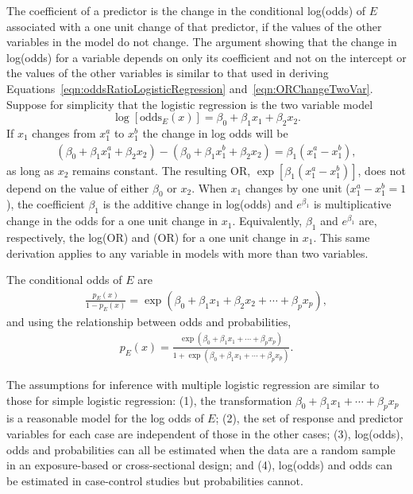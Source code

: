 The coefficient of a predictor is the change in the conditional log(odds) of $E$ associated with a one unit change of that predictor, if the values of the other variables in the model do not change.  The argument showing that the change in log(odds) for a variable depends on only its coefficient and not on the intercept or the values of the other variables is similar to that used in deriving Equations~\ref{eqn:oddsRatioLogisticRegression} and~\ref{eqn:ORChangeTwoVar}.  Suppose for simplicity that the logistic regression is the two variable model\[
  \log\left[\text{odds}_E(x)\right] = \beta_0 + \beta_1 x_1 +
      \beta_2 x_2.
\]
If $x_1$ changes from $x_1^a$ to $x_1^b$ the change in log odds will be
\begin{align*}
  (\beta_0 + \beta_1 x_1^a + \beta_2 x_2) -  (\beta_0 + \beta_1 x_1^b + \beta_2 x_2)
    = \beta_1(x_1^a - x_1^b),
\end{align*}
as long as $x_2$ remains constant.  The resulting OR, $\exp[\beta_1(x_1^a - x_1^b)]$, does not depend on the value of either $\beta_0$ or $x_2$. When $x_1$ changes by one unit ($x_1^a - x_1^b = 1$), the coefficient $\beta_1$ is the additive change in log(odds) and $e^{\beta_1}$ is multiplicative change in the odds for a one unit change in $x_1$. Equivalently, $\beta_1$ and  $e^{\beta_1}$ are, respectively, the log(OR) and (OR) for a one unit change in $x_1$. This same derivation applies to any variable in models with more than two variables.

The conditional odds of $E$ are
\begin{align}
  \frac{p_E(x)}{1 - p_E(x)} = \exp(\beta_0 + \beta_1 x_1 +
  \beta_2 x_2 + \cdots + \beta_p x_p),
  \label{eqn:oddsMultipleLogistic}
\end{align}
and using the relationship between odds and probabilities,
\begin{align}
  p_E(x) = \frac{\exp(\beta_0 + \beta_1 x_1 + \cdots + \beta_p x_p)}
         {1 + \exp(\beta_0 + \beta_1 x_1 + \cdots + \beta_p x_p)}.
         \label{eqn:probabilityMultipleLogistic}
\end{align}


The assumptions for inference with multiple logistic regression are similar to those for simple logistic regression: (1), the transformation $\beta_0 + \beta_1 x_1 + \cdots + \beta_p x_p$ is a reasonable model for the log odds of $E$; (2), the set of response and predictor variables for each case are independent of those in the other cases; (3), log(odds), odds and probabilities can all be estimated when the data are a random sample in an exposure-based or cross-sectional design; and (4), log(odds) and odds can be estimated in case-control studies but probabilities cannot.

